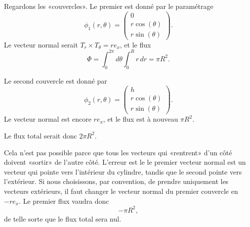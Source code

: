 \begin{example}
	Regardons les «couvercles». Le premier est donné par le paramétrage
	\begin{equation}
		\phi_1(r,\theta)=\begin{pmatrix}
			0             \\
			r\cos(\theta) \\
			r\sin(\theta)
		\end{pmatrix}.
	\end{equation}
	Le vecteur normal serait $T_r\times T_{\theta}=re_x$, et le flux
	\begin{equation}
		\Phi=\int_0^{2\pi}d\theta\int_0^Rr\,dr=\pi R^2.
	\end{equation}

	Le second couvercle est donné par
	\begin{equation}
		\phi_2(r,\theta)=\begin{pmatrix}
			h             \\
			r\cos(\theta) \\
			r\sin(\theta)
		\end{pmatrix}.
	\end{equation}
	Le vecteur normal est encore $re_x$, et le flux est à nouveau $\pi R^2$.

	Le flux total serait donc $2\pi R^2$.

	Cela n'est pas possible parce que tous les vecteurs qui «rentrent» d'un côté doivent «sortir» de l'autre côté. L'erreur est le le premier vecteur normal est un vecteur qui pointe vers l'intérieur du cylindre, tandis que le second pointe vers l'extérieur. Si nous choisissons, par convention, de prendre uniquement les vecteurs extérieurs, il faut changer le vecteur normal du premier couvercle en $-re_x$. Le premier flux vaudra donc
	\begin{equation}
		-\pi R^2,
	\end{equation}
	de telle sorte que le flux total sera nul.
\end{example}

